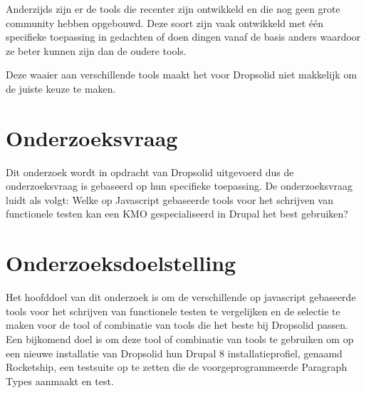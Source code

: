 Anderzijds zijn er de \glspl{tool} die recenter zijn ontwikkeld en die nog geen grote community hebben opgebouwd. Deze soort zijn  vaak ontwikkeld met één specifieke toepassing in gedachten of doen dingen vanaf de basis anders waardoor ze beter kunnen zijn dan de oudere \glspl{tool}. 

Deze waaier aan verschillende \glspl{tool} maakt het voor Dropsolid niet makkelijk om de juiste keuze te maken.



\section{Onderzoeksvraag}
\label{sec:onderzoeksvraag}
Dit onderzoek wordt in opdracht van Dropsolid uitgevoerd dus de onderzoeksvraag is gebaseerd op hun specifieke toepassing. De onderzoeksvraag luidt als volgt: Welke op Javascript gebaseerde \glspl{tool} voor het schrijven van functionele testen kan een \gls{KMO} gespecialiseerd in Drupal het best gebruiken?


\section{Onderzoeksdoelstelling}
\label{sec:onderzoeksdoelstelling}
Het hoofddoel van dit onderzoek is om de verschillende op javascript gebaseerde \glspl{tool} voor het schrijven van functionele testen te vergelijken en de selectie te maken voor de \gls{tool} of combinatie van \glspl{tool} die het beste bij Dropsolid passen. Een bijkomend doel is om deze \gls{tool} of combinatie van \glspl{tool} te gebruiken om op een nieuwe installatie van Dropsolid hun Drupal 8 installatieprofiel, genaamd Rocketship, een \gls{testsuite} op te zetten die de voorgeprogrammeerde \gls{Paragraph Types} aanmaakt en test.


